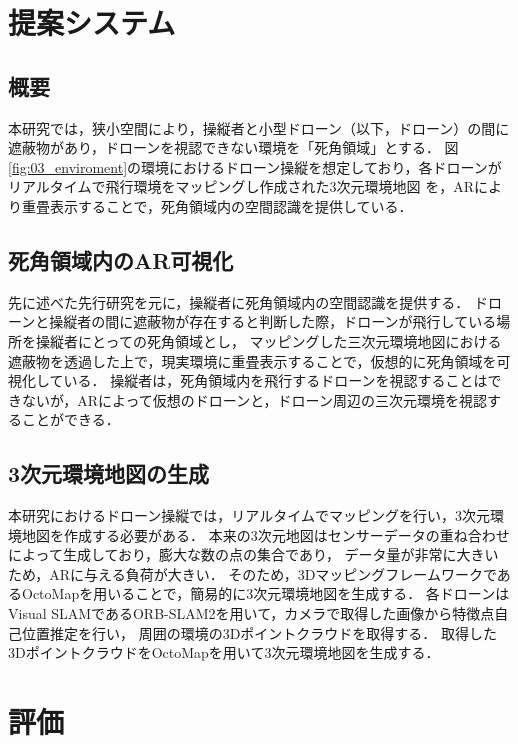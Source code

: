\documentclass[a4paper,10pt,twocolumn,uplatex]{jsarticle}
\begin{document}

\section{提案システム}
\subsection{概要}
本研究では，狭小空間により，操縦者と小型ドローン（以下，ドローン）の間に遮蔽物があり，ドローンを視認できない環境を「死角領域」とする．
図\ref{fig:03_enviroment}の環境におけるドローン操縦を想定しており，各ドローンがリアルタイムで飛行環境をマッピングし作成された3次元環境地図
を，ARにより重畳表示することで，死角領域内の空間認識を提供している．
\par

\subsection{死角領域内のAR可視化}
先に述べた先行研究\cite{Erat}を元に，操縦者に死角領域内の空間認識を提供する．
ドローンと操縦者の間に遮蔽物が存在すると判断した際，ドローンが飛行している場所を操縦者にとっての死角領域とし，
マッピングした三次元環境地図における遮蔽物を透過した上で，現実環境に重畳表示することで，仮想的に死角領域を可視化している．
操縦者は，死角領域内を飛行するドローンを視認することはできないが，ARによって仮想のドローンと，ドローン周辺の三次元環境を視認することができる．

\subsection{3次元環境地図の生成}
本研究におけるドローン操縦では，リアルタイムでマッピングを行い，3次元環境地図を作成する必要がある．
本来の3次元地図はセンサーデータの重ね合わせによって生成しており，膨大な数の点の集合であり，
データ量が非常に大きいため，ARに与える負荷が大きい．
そのため，3DマッピングフレームワークであるOctoMapを用いることで，簡易的に3次元環境地図を生成する．
各ドローンはVisual SLAMであるORB-SLAM2を用いて，カメラで取得した画像から特徴点自己位置推定を行い，
周囲の環境の3Dポイントクラウドを取得する．
取得した3DポイントクラウドをOctoMapを用いて3次元環境地図を生成する．

\section{評価}
\end{document}
